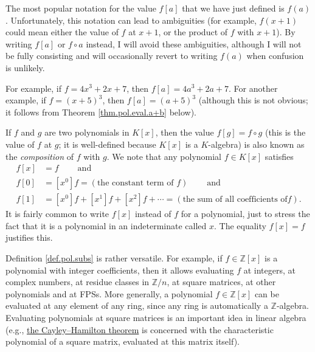 The most popular notation for the value $f\left[  a\right]  $ that we have
just defined is $f\left(  a\right)  $. Unfortunately, this notation can lead
to ambiguities (for example, $f\left(  x+1\right)  $ could mean either the
value of $f$ at $x+1$, or the product of $f$ with $x+1$). By writing $f\left[
a\right]  $ or $f\circ a$ instead, I will avoid these ambiguities, although I
will not be fully consisting and will occasionally revert to writing $f\left(
a\right)  $ when confusion is unlikely.

For example, if $f=4x^{3}+2x+7$, then $f\left[  a\right]  =4a^{3}+2a+7$. For
another example, if $f=\left(  x+5\right)  ^{3}$, then $f\left[  a\right]
=\left(  a+5\right)  ^{3}$ (although this is not obvious; it follows from
Theorem \ref{thm.pol.eval.a+b} below). \medskip

If $f$ and $g$ are two polynomials in $K\left[  x\right]  $, then the value
$f\left[  g\right]  =f\circ g$ (this is the value of $f$ at $g$; it is
well-defined because $K\left[  x\right]  $ is a $K$-algebra) is also known as
the \emph{composition} of $f$ with $g$. We note that any polynomial $f\in
K\left[  x\right]  $ satisfies
\begin{align*}
f\left[  x\right]   &  =f\ \ \ \ \ \ \ \ \ \ \text{and}\\
f\left[  0\right]   &  =\left[  x^{0}\right]  f=\left(  \text{the constant
term of }f\right)  \ \ \ \ \ \ \ \ \ \ \text{and}\\
f\left[  1\right]   &  =\left[  x^{0}\right]  f+\left[  x^{1}\right]
f+\left[  x^{2}\right]  f+\cdots=\left(  \text{the sum of all coefficients of
}f\right)  .
\end{align*}
It is fairly common to write $f\left[  x\right]  $ instead of $f$ for a
polynomial, just to stress the fact that it is a polynomial in an
indeterminate called $x$. The equality $f\left[  x\right]  =f$ justifies this.
\medskip

Definition \ref{def.pol.subs} is rather versatile. For example, if
$f\in\mathbb{Z}\left[  x\right]  $ is a polynomial with integer coefficients,
then it allows evaluating $f$ at integers, at complex numbers, at residue
classes in $\mathbb{Z}/n$, at square matrices, at other polynomials and at
FPSs. More generally, a polynomial $f\in\mathbb{Z}\left[  x\right]  $ can be
evaluated at any element of any ring, since any ring is automatically a
$\mathbb{Z}$-algebra. Evaluating polynomials at square matrices is an
important idea in linear algebra (e.g.,
\href{https://en.wikipedia.org/wiki/Cayley-Hamilton_theorem}{the
Cayley--Hamilton theorem} is concerned with the characteristic polynomial of a
square matrix, evaluated at this matrix itself).

